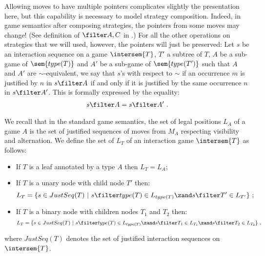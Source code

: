 Allowing moves to have multiple pointers complicates slightly the
presentation here, but this capability is necessary to model
strategy composition. Indeed, in game semantics after composing
strategies, the pointers from some moves may change! (See definition
of $\filter A,C$ in \cite{abramsky:game-semantics-tutorial}.) For
all the other operations on strategies that we will used, however,
the pointers will just be preserved: Let $s$ be an  interaction
sequence on a game $\intersem{T}$, $T'$ a subtree of $T$, $A$ be a
sub-game of $\sem{type(T)}$ and $A'$ be a sub-game of
$\sem{type(T')}$ such that $A$ and $A'$ are $\sim$-equivalent, we
say that $s$'s 
with respect to $\sim$ if an occurrence $m$ is justified by $n$ in
$s\filter A$ if and only if it is justified by the same occurrence
$n$ in $s \filter A'$. This is formally expressed by the equality:
\begin{align*}
s\filter A = s\filter A' \ .
\end{align*}

\begin{definition} We recall
that in the standard game semantics, the set of legal positions
$L_A$ of a game $A$ is the set of justified sequences of moves from
$M_A$ respecting visibility and alternation. We define the set of
 $L_T$ of an interaction game $\intersem{T}$ as
follows:
    \begin{itemize}
    \item If $T$ is a leaf annotated by a type $A$ then $L_T =
    L_A$;
    \item If $T$ is a unary node with child node $T'$ then:
    $$L_T = \{ s \in JustSeq(T) \ | \ s \filter type(T) \in L_{type(T)} \zand  s \filter T' \in L_{T'} \} \ ;$$
    \item If $T$ is a binary node with children nodes $T_1$ and $T_2$ then:
    $$L_T = \{ s \in JustSeq(T) \ | \ s \filter type(T) \in L_{type(T)} \zand  s \filter T_1 \in L_{T_1}
    \zand  s \filter T_2 \in L_{T_2} \} \ .$$
    \end{itemize}
    where $JustSeq(T)$ denotes the set of justified interaction sequences on
    $\intersem{T}$.
\end{definition}


